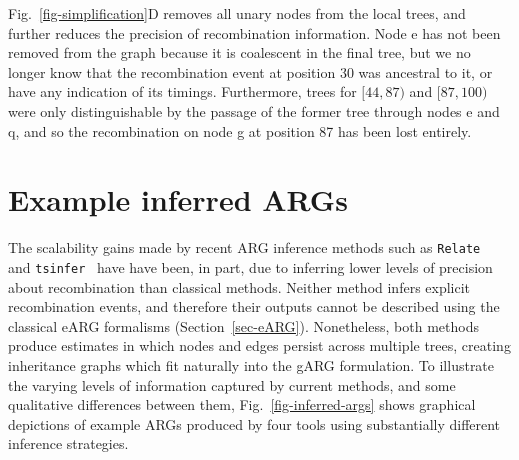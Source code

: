 \documentclass{article}
\newcommand{\noderef}[1]{\textsf{#1}}
\newcommand{\tsinfer}[0]{\texttt{tsinfer}}
\newcommand{\relate}[0]{\texttt{Relate}}
\begin{document}
Fig.~\ref{fig-simplification}D removes all unary nodes from the
local trees, and further reduces the precision of
recombination information. Node \noderef{e} has not been
removed from the graph because it is coalescent in the
final tree, but we no longer know that the recombination
event at position 30 was ancestral to it, or have
any indication of its timings. Furthermore,
trees for $[44, 87)$ and $[87, 100)$ were only distinguishable
by the passage of the former tree through nodes \noderef{e}
and \noderef{q}, and so the recombination on node \noderef{g}
at position 87 has been lost entirely.

\section{Example inferred ARGs}
\label{sec-example-inferred-args}
The scalability gains made by recent ARG inference methods
such as \relate~\citep{speidel2019method} and
\tsinfer~\citep{kelleher2019inferring} have
have been, in part, due to inferring lower levels of precision about
recombination than classical methods.
Neither method infers
explicit recombination events, and therefore their outputs cannot
be described using the classical eARG formalisms (Section~\ref{sec-eARG}).
Nonetheless, both methods produce estimates in which nodes and edges
persist across multiple trees, creating
inheritance graphs which fit naturally into the gARG formulation.
To illustrate the varying levels of information captured
by current methods, and some qualitative differences between them,
Fig.~\ref{fig-inferred-args} shows graphical depictions of
example ARGs produced by four tools using substantially
different inference strategies.

\end{document}
